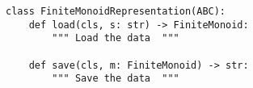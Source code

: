\begin{verbatim}
class FiniteMonoidRepresentation(ABC):
    def load(cls, s: str) -> FiniteMonoid:
        """ Load the data  """

    def save(cls, m: FiniteMonoid) -> str:
        """ Save the data  """
\end{verbatim}